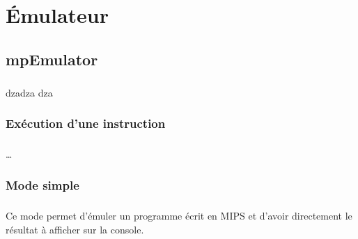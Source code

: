 \documentclass[12pt]{report} %
\begin{document}
\chapter{Émulateur}

\section{mpEmulator}

    \paragraph{}
    dzadza dza

    \subsection{Exécution d'une instruction}

    \paragraph{}
    \dots



    \subsection{Mode simple}

    \paragraph{}
    Ce mode permet d'émuler un programme écrit en {\ttfamily MIPS} et d'avoir directement le résultat à afficher sur la console.
\end{document}
